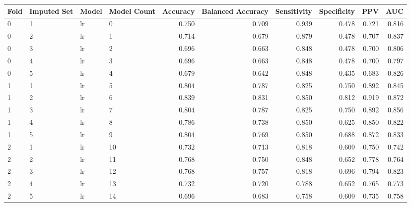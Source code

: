 \begin{table}[ht]
\centering
\begin{adjustbox}{width=\textwidth}
\begin{tabular}{llllrrrrrr}
Fold & Imputed Set & Model & Model Count &   Accuracy &  Balanced Accuracy &  
Sensitivity &  
Specificity & PPV & AUC \\ \hline
   0 &           1 &    lr &           0 & 0.750 &  0.709 &        0.939 &       
 0.478 & 0.721 & 0.816 \\
   0 &           2 &    lr &           1 & 0.714 &  0.679 &        0.879 &       
 0.478 & 0.707 & 0.837 \\
   0 &           3 &    lr &           2 & 0.696 &  0.663 &        0.848 &       
 0.478 & 0.700 & 0.806 \\
   0 &           4 &    lr &           3 & 0.696 &  0.663 &        0.848 &       
 0.478 & 0.700 & 0.797 \\
   0 &           5 &    lr &           4 & 0.679 &  0.642 &        0.848 &       
 0.435 & 0.683 & 0.826 \\
   1 &           1 &    lr &           5 & 0.804 &  0.787 &        0.825 &       
 0.750 & 0.892 & 0.845 \\
   1 &           2 &    lr &           6 & 0.839 &  0.831 &        0.850 &       
 0.812 & 0.919 & 0.872 \\
   1 &           3 &    lr &           7 & 0.804 &  0.787 &        0.825 &       
 0.750 & 0.892 & 0.856 \\
   1 &           4 &    lr &           8 & 0.786 &  0.738 &        0.850 &       
 0.625 & 0.850 & 0.822 \\
   1 &           5 &    lr &           9 & 0.804 &  0.769 &        0.850 &       
 0.688 & 0.872 & 0.833 \\
   2 &           1 &    lr &          10 & 0.732 &  0.713 &        0.818 &       
 0.609 & 0.750 & 0.742 \\
   2 &           2 &    lr &          11 & 0.768 &  0.750 &        0.848 &       
 0.652 & 0.778 & 0.764 \\
   2 &           3 &    lr &          12 & 0.768 &  0.757 &        0.818 &       
 0.696 & 0.794 & 0.823 \\
   2 &           4 &    lr &          13 & 0.732 &  0.720 &        0.788 &       
 0.652 & 0.765 & 0.773 \\
   2 &           5 &    lr &          14 & 0.696 &  0.683 &        0.758 &       
 0.609 & 0.735 & 0.758 \\

\end{tabular}
\end{adjustbox}
\end{table}
